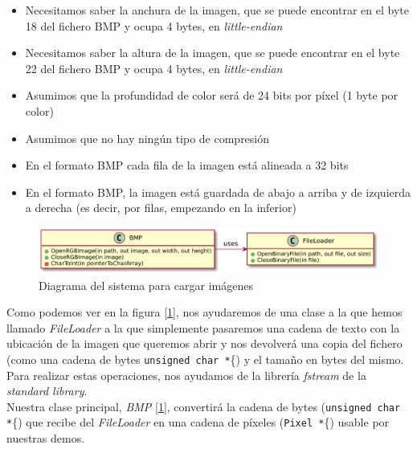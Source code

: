 \begin{itemize}
	\item Necesitamos saber la anchura de la imagen, que se puede encontrar en el byte 18 del fichero BMP y ocupa 4 bytes, en \emph{little-endian}
	\item Necesitamos saber la altura de la imagen, que se puede encontrar en el byte 22 del fichero BMP y ocupa 4 bytes, en \emph{little-endian}
	\item Asumimos que la profundidad de color será de 24 bits por píxel (1 byte por color)
	\item Asumimos que no hay ningún tipo de compresión
	\item En el formato BMP cada fila de la imagen está alineada a 32 bits
	\item En el formato BMP, la imagen está guardada de abajo a arriba y de izquierda a derecha (es decir, por filas, empezando en la inferior)
\end{itemize}

%
%
%
%
%

\begin{figure}[h]
	\centering
	\includegraphics[width=14cm]{archivos/bmpuml}
	\caption{Diagrama del sistema para cargar imágenes}
	\label{fig:bmpuml}
\end{figure}

Como podemos ver en la figura [\ref{fig:bmpuml}], nos ayudaremos de una clase a la que hemos llamado \emph{FileLoader} a la que simplemente pasaremos una cadena de texto con la ubicación de la imagen que queremos abrir y nos devolverá una copia del fichero (como una cadena de bytes \lstinline{unsigned char *}\{) y el tamaño en bytes del mismo. Para realizar estas operaciones, nos ayudamos de la librería \emph{fstream} de la \emph{standard library}.\\

Nuestra clase principal, \emph{BMP} [\ref{fig:bmpuml}], convertirá la cadena de bytes (\lstinline{unsigned char *}\{) que recibe del \emph{FileLoader} en una cadena de píxeles (\lstinline{Pixel *}\{) usable por nuestras demos.\\

